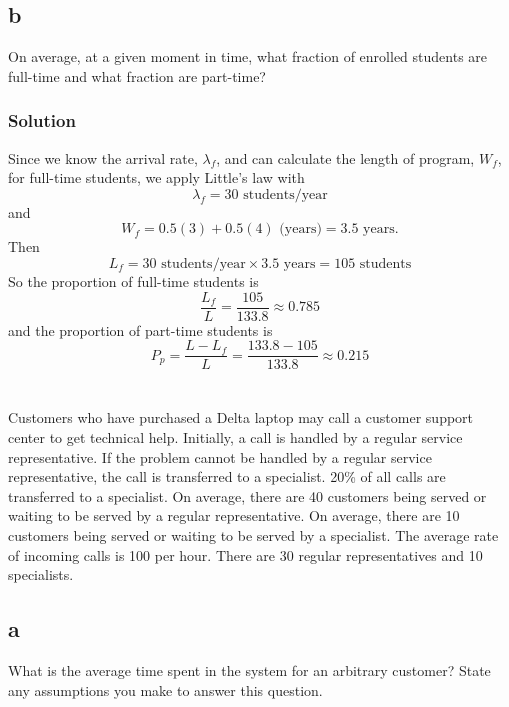 \documentclass[letterpaper]{amsart}
\begin{document}
\subsection*{b}
On average, at a given moment in time, what fraction of enrolled students are
full-time and what fraction are part-time?

\subsubsection*{Solution}
Since we know the arrival rate, $\lambda_f$, and can calculate the length of program, $W_f$, for
full-time students, we apply Little's law with
\begin{equation}
\lambda_f = 30\text{ students/year}
\end{equation}
and
\begin{equation}
  W_f =0.5(3) + 0.5(4)\text{ (years)}
     = 3.5 \text{ years}.
\end{equation}
Then
\begin{equation}
  L_f = 30\text{ students/year} \times 3.5 \text{ years} = 105\text{ students}
\end{equation}
So the proportion of full-time students is
\begin{equation}
  \frac{L_f}{L}=\frac{105}{133.8} \approx 0.785
\end{equation}
and the proportion of part-time students is
\begin{equation}
  P_p = \frac{L-L_f}{L}=\frac{133.8-105}{133.8} \approx 0.215
\end{equation}

\section{} %
Customers who have purchased a Delta laptop may call a customer support center to get technical help. Initially, a call is handled by a regular service representative. If the problem cannot be handled by a regular service representative, the call is transferred to a specialist. 20\% of all calls are transferred to a specialist. On average, there are 40
customers being served or waiting to be served by a regular representative. On average,
there are 10 customers being served or waiting to be served by a specialist. The average
rate of incoming calls is 100 per hour. There are 30 regular representatives and 10
specialists.

\subsection*{a}
What is the average time spent in the system for an arbitrary customer? State any
assumptions you make to answer this question.
\end{document}
